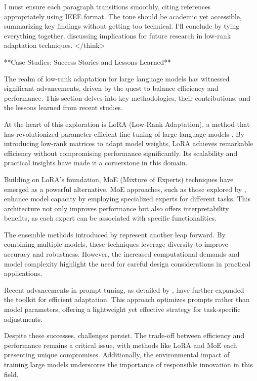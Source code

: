 \documentclass[conference]{IEEEtran}
\begin{document}
I must ensure each paragraph transitions smoothly, citing references appropriately using IEEE format. The tone should be academic yet accessible, summarizing key findings without getting too technical. I'll conclude by tying everything together, discussing implications for future research in low-rank adaptation techniques.
</think>

**Case Studies: Success Stories and Lessons Learned**

The realm of low-rank adaptation for large language models has witnessed significant advancements, driven by the quest to balance efficiency and performance. This section delves into key methodologies, their contributions, and the lessons learned from recent studies.

At the heart of this exploration is LoRA (Low-Rank Adaptation), a method that has revolutionized parameter-efficient fine-tuning of large language models \cite{bX}. By introducing low-rank matrices to adapt model weights, LoRA achieves remarkable efficiency without compromising performance significantly. Its scalability and practical insights have made it a cornerstone in this domain.

Building on LoRA's foundation, MoE (Mixture of Experts) techniques have emerged as a powerful alternative. MoE approaches, such as those explored by \cite{bY}, enhance model capacity by employing specialized experts for different tasks. This architecture not only improves performance but also offers interpretability benefits, as each expert can be associated with specific functionalities.

The ensemble methods introduced by \cite{bZ} represent another leap forward. By combining multiple models, these techniques leverage diversity to improve accuracy and robustness. However, the increased computational demands and model complexity highlight the need for careful design considerations in practical applications.

Recent advancements in prompt tuning, as detailed by \cite{bW}, have further expanded the toolkit for efficient adaptation. This approach optimizes prompts rather than model parameters, offering a lightweight yet effective strategy for task-specific adjustments.

Despite these successes, challenges persist. The trade-off between efficiency and performance remains a critical issue, with methods like LoRA and MoE each presenting unique compromises. Additionally, the environmental impact of training large models underscores the importance of responsible innovation in this field.
\end{document}
